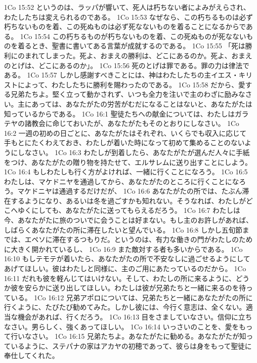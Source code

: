 1Co 15:52  というのは、ラッパが響いて、死人は朽ちない者によみがえらされ、わたしたちは変えられるのである。
1Co 15:53  なぜなら、この朽ちるものは必ず朽ちないものを着、この死ぬものは必ず死なないものを着ることになるからである。
1Co 15:54  この朽ちるものが朽ちないものを着、この死ぬものが死なないものを着るとき、聖書に書いてある言葉が成就するのである。
1Co 15:55  「死は勝利にのまれてしまった。死よ、おまえの勝利は、どこにあるのか。死よ、おまえのとげは、どこにあるのか」。
1Co 15:56  死のとげは罪である。罪の力は律法である。
1Co 15:57  しかし感謝すべきことには、神はわたしたちの主イエス・キリストによって、わたしたちに勝利を賜わったのである。
1Co 15:58  だから、愛する兄弟たちよ。堅く立って動かされず、いつも全力を注いで主のわざに励みなさい。主にあっては、あなたがたの労苦がむだになることはないと、あなたがたは知っているからである。
1Co 16:1  聖徒たちへの献金については、わたしはガラテヤの諸教会に命じておいたが、あなたがたもそのとおりにしなさい。
1Co 16:2  一週の初めの日ごとに、あなたがたはそれぞれ、いくらでも収入に応じて手もとにたくわえておき、わたしが着いた時になって初めて集めることのないようにしなさい。
1Co 16:3  わたしが到着したら、あなたがたが選んだ人々に手紙をつけ、あなたがたの贈り物を持たせて、エルサレムに送り出すことにしよう。
1Co 16:4  もしわたしも行く方がよければ、一緒に行くことになろう。
1Co 16:5  わたしは、マケドニヤを通過してから、あなたがたのところに行くことになろう。マケドニヤは通過するだけだが、
1Co 16:6  あなたがたの所では、たぶん滞在するようになり、あるいは冬を過ごすかも知れない。そうなれば、わたしがどこへゆくにしても、あなたがたに送ってもらえるだろう。
1Co 16:7  わたしは今、あなたがたに旅のついでに会うことは好まない。もし主のお許しがあれば、しばらくあなたがたの所に滞在したいと望んでいる。
1Co 16:8  しかし五旬節までは、エペソに滞在するつもりだ。というのは、有力な働きの門がわたしのために大きく開かれているし、
1Co 16:9  また敵対する者も多いからである。
1Co 16:10  もしテモテが着いたら、あなたがたの所で不安なしに過ごせるようにしてあげてほしい。彼はわたしと同様に、主のご用にあたっているのだから。
1Co 16:11  だれも彼を軽んじてはいけない。そして、わたしの所に来るように、どうか彼を安らかに送り出してほしい。わたしは彼が兄弟たちと一緒に来るのを待っている。
1Co 16:12  兄弟アポロについては、兄弟たちと一緒にあなたがたの所に行くように、たびたび勧めてみた。しかし彼には、今行く意志は、全くない。適当な機会があれば、行くだろう。
1Co 16:13  目をさましていなさい。信仰に立ちなさい。男らしく、強くあってほしい。
1Co 16:14  いっさいのことを、愛をもって行いなさい。
1Co 16:15  兄弟たちよ。あなたがたに勧める。あなたがたが知っているように、ステパナの家はアカヤの初穂であって、彼らは身をもって聖徒に奉仕してくれた。
